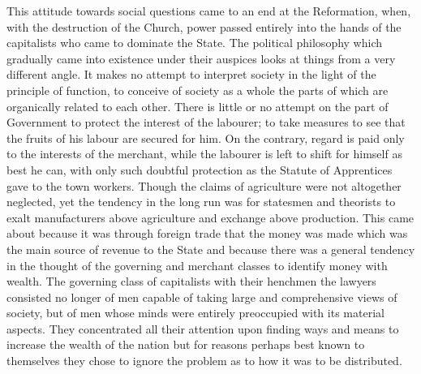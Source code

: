 \documentclass{book}
\begin{document}
This attitude towards social questions came to an end at the Reformation, when, with the destruction of the Church, power passed entirely into the hands of the capitalists who came to dominate the State. The political philosophy which gradually came into existence under their auspices looks at things from a very different angle. It makes no attempt to interpret society in the light of the principle of function, to conceive of society as a whole the parts of which are organically related to each other. There is little or no attempt on the part of Government to protect the interest of the labourer; to take measures to see that the fruits of his labour are secured for him. On the contrary, regard is paid only to the interests of the merchant, while the labourer is left to shift for himself as best he can, with only such doubtful protection as the Statute of Apprentices gave to the town workers. Though the claims of agriculture were not altogether neglected, yet the tendency in the long run was for statesmen and theorists to exalt manufacturers above agriculture and exchange above production. This came about because it was through foreign trade that the money was made which was the main source of revenue to the State and because there was a general tendency in the thought of the governing and merchant classes to identify money with wealth. The governing class of capitalists with their henchmen the lawyers consisted no longer of men capable of taking large and comprehensive views of society, but of men whose minds were entirely preoccupied with its material aspects. They concentrated all their attention upon finding ways and means to increase the wealth of the nation but for reasons perhaps best known to themselves they chose to ignore the problem as to how it was to be distributed.
\end{document}
